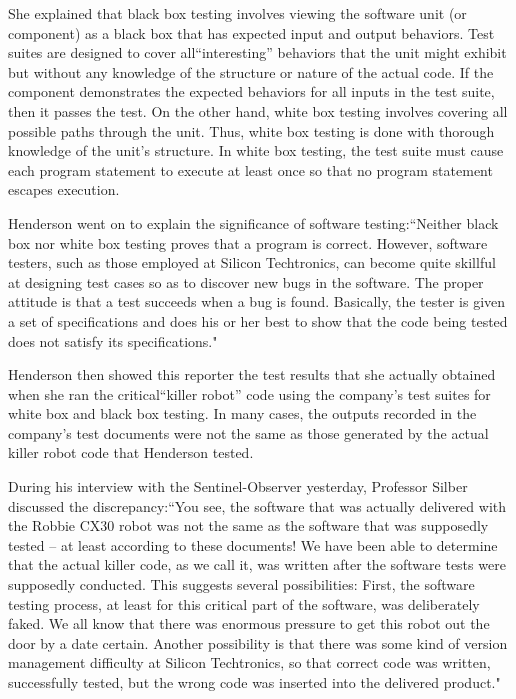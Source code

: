 She explained that black box testing involves viewing the software unit (or component) as a black box that has expected input and output behaviors. Test suites are designed to cover all``interesting'' behaviors that the unit might exhibit but without any knowledge of the structure or nature of the actual code. If the component demonstrates the expected behaviors for all inputs in the test suite, then it passes the test. On the other hand, white box testing involves covering all possible paths through the unit. Thus, white box testing is done with thorough knowledge of the unit's structure. In white box testing, the test suite must cause each program statement to execute at least once so that no program statement escapes execution.

Henderson went on to explain the significance of software testing:``Neither black box nor white box testing proves that a program is correct. However, software testers, such as those employed at Silicon Techtronics, can become quite skillful at designing test cases so as to discover new bugs in the software. The proper attitude is that a test succeeds when a bug is found. Basically, the tester is given a set of specifications and does his or her best to show that the code being tested does not satisfy its specifications."

Henderson then showed this reporter the test results that she actually obtained when she ran the critical``killer robot'' code using the company's test suites for white box and black box testing. In many cases, the outputs recorded in the company's test documents were not the same as those generated by the actual killer robot code that Henderson tested.

During his interview with the Sentinel-Observer yesterday, Professor Silber discussed the discrepancy:``You see, the software that was actually delivered with the Robbie CX30 robot was not the same as the software that was supposedly tested -- at least according to these documents! We have been able to determine that the actual killer code, as we call it, was written after the software tests were supposedly conducted. This suggests several possibilities: First, the software testing process, at least for this critical part of the software, was deliberately faked. We all know that there was enormous pressure to get this robot out the door by a date certain. Another possibility is that there was some kind of version management difficulty at Silicon Techtronics, so that correct code was written, successfully tested, but the wrong code was inserted into the delivered product."

